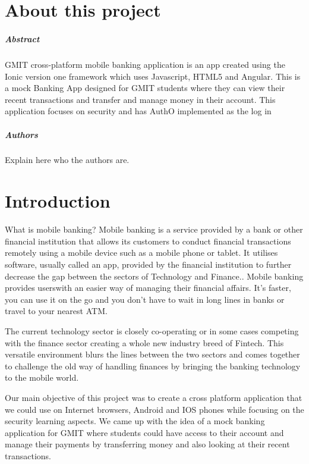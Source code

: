 
\chapter*{About this project}
\paragraph{Abstract}
GMIT cross-platform mobile banking application is an app created using the Ionic version one framework which uses Javascript, HTML5 and Angular. This is a mock Banking App designed for GMIT students where they can view their recent transactions and transfer and manage money in their account. This application focuses on security and has AuthO implemented as the log in

\paragraph{Authors}
Explain here who the authors are.



\chapter{Introduction}
What is mobile banking? Mobile banking is a service provided by a bank or other financial institution that allows its customers to conduct financial transactions remotely using a mobile device such as a mobile phone or tablet\cite{mobilebankingwiki}. It utilises software, usually called an app, provided by the financial institution to further decrease the gap between the sectors of Technology and Finance.\cite{mobilebankingwiki}. Mobile banking provides userswith an easier way of managing their financial affairs. It's faster, you can use it on the go and you don't have to wait in long lines in banks or travel to your nearest ATM.

The current technology sector is closely co-operating or in some cases competing with the finance sector creating a whole new industry breed of Fintech. This versatile environment blurs the lines between the two sectors and comes together to challenge the old way of handling finances by bringing the banking technology to the mobile world.\cite{fintech}

Our main objective of this project was to create a cross platform application that we could use on Internet browsers, Android and IOS phones while focusing on the security learning aspects. We came up with the idea of a mock banking application for GMIT where students could have access to their account and manage their payments by transferring  money and also looking at their recent transactions.


